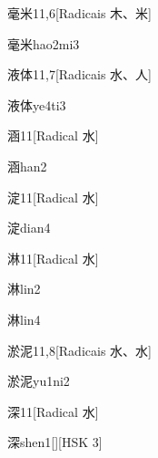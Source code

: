 \begin{entry}{毫米}{11,6}[Radicais ⽊、⽶]
  \begin{phonetics}{毫米}{hao2mi3}
  \end{phonetics}
\end{entry}

\begin{entry}{液体}{11,7}[Radicais ⽔、⼈]
  \begin{phonetics}{液体}{ye4ti3}
  \end{phonetics}
\end{entry}

\begin{entry}{涵}{11}[Radical ⽔]
  \begin{phonetics}{涵}{han2}
  \end{phonetics}
\end{entry}

\begin{entry}{淀}{11}[Radical ⽔]
  \begin{phonetics}{淀}{dian4}
  \end{phonetics}
\end{entry}

\begin{entry}{淋}{11}[Radical ⽔]
  \begin{phonetics}{淋}{lin2}
  \end{phonetics}
  \begin{phonetics}{淋}{lin4}
  \end{phonetics}
\end{entry}

\begin{entry}{淤泥}{11,8}[Radicais ⽔、⽔]
  \begin{phonetics}{淤泥}{yu1ni2}
  \end{phonetics}
\end{entry}

\begin{entry}{深}{11}[Radical ⽔]
  \begin{phonetics}{深}{shen1}[][HSK 3]
  \end{phonetics}
\end{entry}

